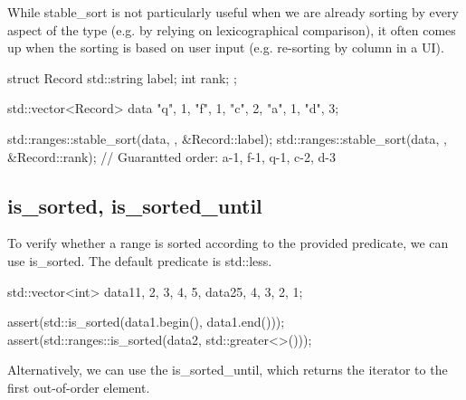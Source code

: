 

While stable\_sort is not particularly useful when we are already sorting by every aspect of the type (e.g. by relying on lexicographical comparison), it often comes up when the sorting is based on user input (e.g. re-sorting by column in a UI).

\begin{box-note}
\begin{cppcode}
struct Record {
    std::string label;
    int rank;
};

std::vector<Record> data {{"q", 1}, {"f", 1}, {"c", 2}, {"a", 1}, {"d", 3}};

std::ranges::stable_sort(data, {}, &Record::label);    
std::ranges::stable_sort(data, {}, &Record::rank);
// Guarantted order: a-1, f-1, q-1, c-2, d-3
\end{cppcode}
\end{box-note}

\subsection{is\_sorted, is\_sorted\_until}

To verify whether a range is sorted according to the provided predicate, we can use is\_sorted. The default predicate is std::less.



\begin{box-note}
\begin{cppcode}
std::vector<int> data1{1, 2, 3, 4, 5}, data2{5, 4, 3, 2, 1};

assert(std::is_sorted(data1.begin(), data1.end()));
assert(std::ranges::is_sorted(data2, std::greater<>()));
\end{cppcode}
\end{box-note}

Alternatively, we can use the is\_sorted\_until, which returns the iterator to the first out-of-order element.



